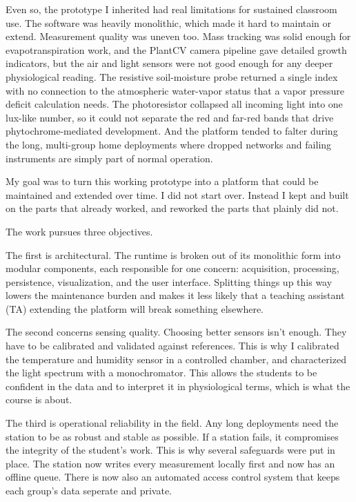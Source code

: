 Even so, the prototype I inherited had real limitations for sustained classroom use. The software was heavily monolithic, which made it hard to maintain or extend. Measurement quality was uneven too. Mass tracking was solid enough for evapotranspiration work, and the PlantCV camera pipeline \parencite{gehan2017plantcv, plantcv} gave detailed growth indicators, but the air and light sensors were not good enough for any deeper physiological reading. The resistive soil-moisture probe returned a single index with no connection to the atmospheric water-vapor status that a vapor pressure deficit calculation needs. The photoresistor collapsed all incoming light into one lux-like number, so it could not separate the red and far-red bands that drive phytochrome-mediated development. And the platform tended to falter during the long, multi-group home deployments where dropped networks and failing instruments are simply part of normal operation.

My goal was to turn this working prototype into a platform that could be maintained and extended over time. I did not start over. Instead I kept and built on the parts that already worked, and reworked the parts that plainly did not.

The work pursues three objectives.

The first is architectural. The runtime is broken out of its monolithic form into modular components, each responsible for one concern: acquisition, processing, persistence, visualization, and the user interface. Splitting things up this way lowers the maintenance burden and makes it less likely that a teaching assistant (TA) extending the platform will break something elsewhere.

The second concerns sensing quality. Choosing better sensors isn't enough. They have to be calibrated and validated against references. This is why I calibrated the temperature and humidity sensor in a controlled chamber, and characterized the light spectrum with a monochromator. This allows the students to be confident in the data and to interpret it in physiological terms, which is what the course is about.

The third is operational reliability in the field. Any long deployments need the station to be as robust and stable as possible. If a station fails, it compromises the integrity of the student's work. This is why several safeguards were put in place. The station now writes every measurement locally first and now has an offline queue. There is now also an automated access control system that keeps each group's data seperate and private. 

